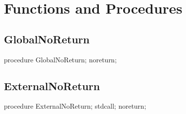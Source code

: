 \documentclass{report}
\begin{document}
\section{Functions and Procedures}
\subsection*{GlobalNoReturn}
\begin{list}{}{
\setlength{\itemindent}{0cm}
\setlength{\listparindent}{0cm}
\setlength{\leftmargin}{\evensidemargin}
\addtolength{\leftmargin}{\tmplength}
\settowidth{\labelsep}{X}
\addtolength{\leftmargin}{\labelsep}
\setlength{\labelwidth}{\tmplength}
}
\begin{flushleft}
\item[\textbf{Declaration}\hfill]
\begin{ttfamily}
procedure GlobalNoReturn; noreturn;\end{ttfamily}


\end{flushleft}
\end{list}
\subsection*{ExternalNoReturn}
\begin{list}{}{
\setlength{\itemindent}{0cm}
\setlength{\listparindent}{0cm}
\setlength{\leftmargin}{\evensidemargin}
\addtolength{\leftmargin}{\tmplength}
\settowidth{\labelsep}{X}
\addtolength{\leftmargin}{\labelsep}
\setlength{\labelwidth}{\tmplength}
}
\begin{flushleft}
\item[\textbf{Declaration}\hfill]
\begin{ttfamily}
procedure ExternalNoReturn; stdcall; noreturn;\end{ttfamily}


\end{flushleft}
\end{list}
\end{document}

